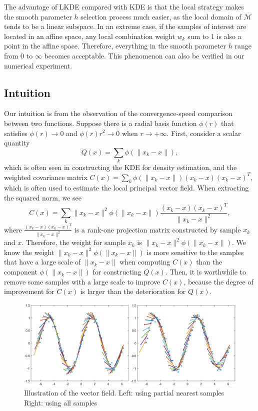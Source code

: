 \documentclass[aos,preprint]{imsart}
\theoremstyle{remark}
\begin{document}
The advantage of LKDE compared with KDE is that the local strategy makes the smooth parameter $h$ selection process much easier, as the local domain of $\mathcal M$ tends to be a linear subspace. In an extreme case, if the samples of interest are located in an affine space, any local combination weight $w_k $ sum to 1 is also a point in the affine space. Therefore, everything in the smooth parameter $h$ range from $0$ to $\infty$ becomes acceptable. This phenomenon can also be verified in our numerical experiment.


\subsection{Intuition}
Our intuition is from the observation of the convergence-speed comparison between two functions. Suppose there is a radial basis function $\phi(r)$ that satisfies $\phi(r)\rightarrow 0$ and $\phi(r)r^2\rightarrow 0$ when $ r \rightarrow +\infty$. First, consider a scalar quantity 
\[
 Q(x) = \sum_k \phi(\|x_k-x\|),
\]
which is often seen in constructing the KDE for density estimation, and the weighted covariance matrix $C(x) = \sum_k \phi(\|x_k-x\|)(x_k-x)(x_k-x)^T$, which is often used to estimate the local principal vector field. When extracting the squared norm, we see
\[
  C(x) = \sum_k \|x_k-x\|^2\phi(\|x_k-x\|)\frac{(x_k-x)(x_k-x)^T}{\|x_k-x\|^2} ,
\]
where $\frac{(x_k-x)(x_k-x)^T}{\|x_k-x\|^2}$ is a rank-one projection matrix constructed by sample $x_k$ and $x$. Therefore, the weight for sample $x_k$ is $\|x_k-x\|^2\phi(\|x_k-x\|)$.
 We know the weight $\|x_k-x\|^2\phi(\|x_k-x\|)$ is more sensitive to the samples that have a large scale of $\|x_k-x\|$ when computing $C(x)$ than the component $\phi(\|x_k-x\|)$ for constructing $Q(x)$. Then, it is worthwhile to remove some samples with a large scale to improve $C(x)$, because the degree of improvement for $C(x)$ is larger than the deterioration for $Q(x)$. %
\begin{figure}[h] %
   \centering
   \includegraphics[width=\linewidth]{field_demo.eps} 
   \caption{Illustration of the vector field. Left: using partial nearest samples Right: using all samples}
   \label{fig:example}
\end{figure}
\end{document}
